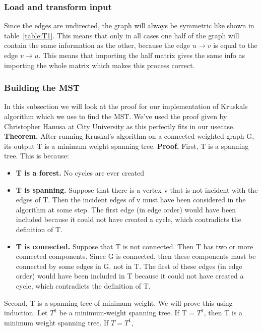\documentclass{article}
\begin{document}
\subsubsection{Load and transform input}
Since the edges are undirected, the graph will always be symmetric like shown in table~\ref{table:T1}. This means that only in all cases one half of the graph will contain the same information as the other, because the edge $u \to v$ is equal to the edge $v \to u$. This means that importing the half matrix gives the same info as importing the whole matrix which makes this process correct.

\subsubsection{Building the MST}
In this subsection we will look at the proof for our implementation of Kruskals algorithm which we use to find the MST. We've used the proof given by Christopher Hanusa at City University as this perfectly fits in our usecase.
\newline
\newline
\textbf{Theorem.} After running Kruskal’s algorithm on a connected weighted graph G, its output T is a
minimum weight spanning tree.
\newline
\newline
\textbf{Proof.} First, T is a spanning tree. This is because:
\begin{itemize}
  \item \textbf{T is a forest.} No cycles are ever created
  \item \textbf{T is spanning.} Suppose that there is a vertex v that is not incident with the edges of T.
Then the incident edges of v must have been considered in the algorithm at some step. The
first edge (in edge order) would have been included because it could not have created a cycle,
which contradicts the definition of T.
  \item \textbf{T is connected.} Suppose that T is not connected. Then T has two or more connected
components. Since G is connected, then these components must be connected by some edges
in G, not in T. The first of these edges (in edge order) would have been included in T because
it could not have created a cycle, which contradicts the definition of T.
\end{itemize}
Second, T is a spanning tree of minimum weight. We will prove this using induction. Let $T^1$ be a
minimum-weight spanning tree. If T = $T^1$, then T is a minimum weight spanning tree. If $T = T^1$,
\end{document}
